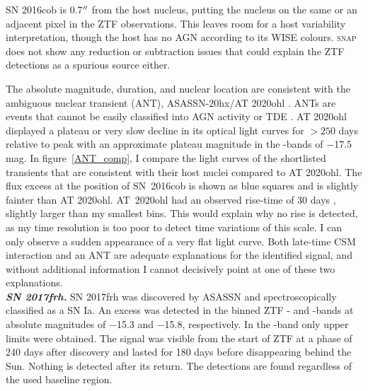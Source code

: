 \documentclass[a4paper,oneside,12pt, class=Latex/Classes/PhDthesisPSnPDF, crop=false]{standalone}
\begin{document}
SN 2016cob is 0.7$^{\prime\prime}$ from the host nucleus, putting the nucleus on the same or an adjacent pixel in the ZTF observations. This leaves room for a host variability interpretation, though the host has no AGN according to its WISE colours. \textsc{snap} does not show any reduction or subtraction issues that could explain the ZTF detections as a spurious source either.

The absolute magnitude, duration, and nuclear location are consistent with the ambiguous nuclear transient (ANT), ASASSN-20hx/AT 2020ohl \citep{Hinkle_Extreme_nuclear_transients/ANTs}. ANTs are events that cannot be easily classified into AGN activity or TDE \citep{wiseman_ztfants}. AT 2020ohl displayed a plateau or very slow decline in its optical light curves for $>250$ days relative to peak with an approximate plateau magnitude in the \ztfg\ztfr\ztfi-bands of $-$17.5 mag. In figure~\ref{ANT_comp}, I compare the light curves of the shortlisted transients that are consistent with their host nuclei compared to AT 2020ohl. The flux excess at the position of SN~2016cob is shown as blue squares and is slightly fainter than AT 2020ohl. AT~2020ohl had an observed rise-time of 30 days \citep{Hinkle_Extreme_nuclear_transients/ANTs}, slightly larger than my smallest bins. This would explain why no rise is detected, as my time resolution is too poor to detect time variations of this scale. I can only observe a sudden appearance of a very flat light curve. Both late-time CSM interaction and an ANT are adequate explanations for the identified signal, and without additional information I cannot decisively point at one of these two explanations.\\


\textit{\textbf{SN 2017frh.}}
SN 2017frh was discovered by ASASSN and spectroscopically classified as a SN Ia. An excess was detected in the binned ZTF \ztfg- and \ztfr-bands at absolute magnitudes of $-$15.3 and $-$15.8, respectively. In the \ztfi-band only upper limits were obtained. The signal was visible from the start of ZTF at a phase of 240 days after discovery and lasted for 180 days before disappearing behind the Sun. Nothing is detected after its return. The detections are found regardless of the used baseline region.
\end{document}

